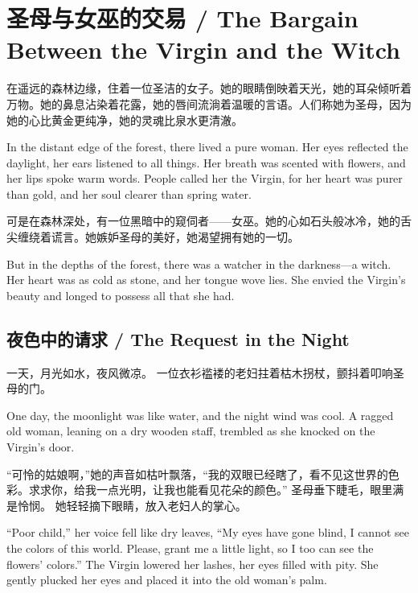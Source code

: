 \chapter*{圣母与女巫的交易 / The Bargain Between the Virgin and the Witch}

在遥远的森林边缘，住着一位圣洁的女子。她的眼睛倒映着天光，她的耳朵倾听着万物。她的鼻息沾染着花露，她的唇间流淌着温暖的言语。人们称她为圣母，因为她的心比黄金更纯净，她的灵魂比泉水更清澈。  
\begin{flushright}
In the distant edge of the forest, there lived a pure woman. Her eyes reflected the daylight, her ears listened to all things. Her breath was scented with flowers, and her lips spoke warm words. People called her the Virgin, for her heart was purer than gold, and her soul clearer than spring water.
\end{flushright}

可是在森林深处，有一位黑暗中的窥伺者——女巫。她的心如石头般冰冷，她的舌尖缠绕着谎言。她嫉妒圣母的美好，她渴望拥有她的一切。  
\begin{flushright}
But in the depths of the forest, there was a watcher in the darkness—a witch. Her heart was as cold as stone, and her tongue wove lies. She envied the Virgin's beauty and longed to possess all that she had.
\end{flushright}

\section*{夜色中的请求 / The Request in the Night}

一天，月光如水，夜风微凉。  
一位衣衫褴褛的老妇拄着枯木拐杖，颤抖着叩响圣母的门。  
\begin{flushright}
One day, the moonlight was like water, and the night wind was cool.  
A ragged old woman, leaning on a dry wooden staff, trembled as she knocked on the Virgin's door.
\end{flushright}

“可怜的姑娘啊，”她的声音如枯叶飘落，“我的双眼已经瞎了，看不见这世界的色彩。求求你，给我一点光明，让我也能看见花朵的颜色。”  
圣母垂下睫毛，眼里满是怜悯。  
她轻轻摘下眼睛，放入老妇人的掌心。  
\begin{flushright}
“Poor child,” her voice fell like dry leaves, “My eyes have gone blind, I cannot see the colors of this world. Please, grant me a little light, so I too can see the flowers' colors.”  
The Virgin lowered her lashes, her eyes filled with pity.  
She gently plucked her eyes and placed it into the old woman's palm.
\end{flushright}

